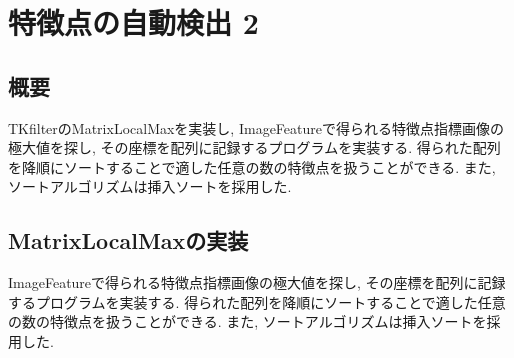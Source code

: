 \documentclass[a4j]{jarticle}
\begin{document}
\section{特徴点の自動検出 2}

\subsection{概要}
TKfilterのMatrixLocalMaxを実装し, ImageFeatureで得られる特徴点指標画像の極大値を探し, その座標を配列に記録するプログラムを実装する. 
得られた配列を降順にソートすることで適した任意の数の特徴点を扱うことができる. 
また, ソートアルゴリズムは挿入ソートを採用した.

\subsection{MatrixLocalMaxの実装}
ImageFeatureで得られる特徴点指標画像の極大値を探し, その座標を配列に記録するプログラムを実装する. 
得られた配列を降順にソートすることで適した任意の数の特徴点を扱うことができる. 
また, ソートアルゴリズムは挿入ソートを採用した. 
\end{document}
